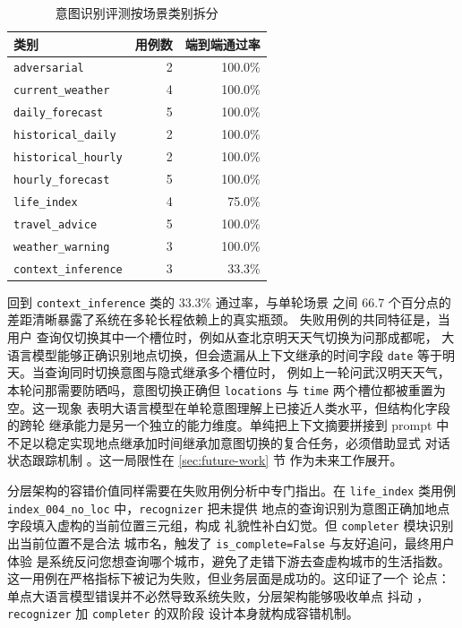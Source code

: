 \begin{table}[!t]
    \centering
    \caption{意图识别评测按场景类别拆分}
    \label{tab:intent-by-category}
    \song\fontsize{9pt}{12pt}\selectfont
    \renewcommand{\arraystretch}{0.95}
    \begin{tabular}{lrr}
        \toprule
        类别 & 用例数 & 端到端通过率 \\
        \midrule
        \texttt{adversarial} & 2 & 100.0\% \\
        \texttt{current\_\bk{}weather} & 4 & 100.0\% \\
        \texttt{daily\_\bk{}forecast} & 5 & 100.0\% \\
        \texttt{historical\_\bk{}daily} & 2 & 100.0\% \\
        \texttt{historical\_\bk{}hourly} & 2 & 100.0\% \\
        \texttt{hourly\_\bk{}forecast} & 5 & 100.0\% \\
        \texttt{life\_\bk{}index} & 4 & 75.0\% \\
        \texttt{travel\_\bk{}advice} & 5 & 100.0\% \\
        \texttt{weather\_\bk{}warning} & 3 & 100.0\% \\
        \texttt{context\_\bk{}inference} & 3 & 33.3\% \\
        \bottomrule
    \end{tabular}
\end{table}

回到 \texttt{context\_\bk{}inference} 类的 33.3\% 通过率，与单轮场景
之间 66.7 个百分点的差距清晰暴露了系统在多轮长程依赖上的真实瓶颈。
失败用例的共同特征是，当用户
查询仅切换其中一个槽位时，例如从查北京明天天气切换为问那成都呢，
大语言模型能够正确识别地点切换，但会遗漏从上下文继承的时间字段
\texttt{date} 等于明天。当查询同时切换意图与隐式继承多个槽位时，
例如上一轮问武汉明天天气，本轮问那需要防晒吗，意图切换正确但
\texttt{locations} 与 \texttt{time} 两个槽位都被重置为空。这一现象
表明大语言模型在单轮意图理解上已接近人类水平，但结构化字段的跨轮
继承能力是另一个独立的能力维度。单纯把上下文摘要拼接到 prompt 中
不足以稳定实现地点继承加时间继承加意图切换的复合任务，必须借助显式
对话状态跟踪机制 \cite{ref29}。这一局限性在 \ref{sec:future-work} 节
作为未来工作展开。

分层架构的容错价值同样需要在失败用例分析中专门指出。在 \texttt{life\_\bk{}index}
类用例 \texttt{index\_\bk{}004\_\bk{}no\_\bk{}loc} 中，\texttt{recognizer} 把未提供
地点的查询识别为意图正确加地点字段填入虚构的当前位置三元组，构成
礼貌性补白幻觉。但 \texttt{completer} 模块识别出当前位置不是合法
城市名，触发了 \texttt{is\_\bk{}complete=\bk{}False} 与友好追问，最终用户体验
是系统反问您想查询哪个城市，避免了走错下游去查虚构城市的生活指数。
这一用例在严格指标下被记为失败，但业务层面是成功的。这印证了一个
论点：单点大语言模型错误并不必然导致系统失败，分层架构能够吸收单点
抖动 \cite{ref10}，\texttt{recognizer} 加 \texttt{completer} 的双阶段
设计本身就构成容错机制。
